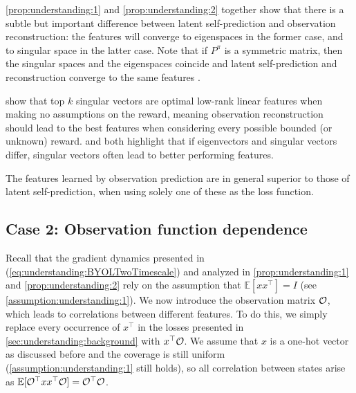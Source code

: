 \autoref{prop:understanding:1} and \autoref{prop:understanding:2} together show that there is a subtle but important difference between latent self-prediction and observation reconstruction: the features will converge to eigenspaces in the former case, and to singular space in the latter case.
Note that if $P^\pi$ is a symmetric matrix, then the singular spaces and the eigenspaces coincide and latent self-prediction and reconstruction converge to the same features \parencite{tang2022understanding}.

\textcite{behzadian2019fast} show that top $k$ singular vectors are optimal low-rank linear features when making no assumptions on the reward, meaning observation reconstruction should lead to the best features when considering every possible bounded (or unknown) reward.
\textcite{behzadian2019fast} and \textcite{lelan2023bootstrapped} both highlight that if eigenvectors and singular vectors differ, singular vectors often lead to better performing features.

\begin{tcolorbox}[boxrule=0.2mm,colback=white,colframe=uoftblue,boxsep=0pt,top=3pt,bottom=5pt]
\begin{insight} The features learned by observation prediction are in general superior to those of latent self-prediction, when using solely one of these as the loss function.
\label{insight:understanding:1}
\end{insight}
\end{tcolorbox}

\subsection{Case 2: Observation function dependence}
\label{sec:understanding:observation}

Recall that the gradient dynamics presented in (\ref{eq:understanding:BYOLTwoTimescale}) and analyzed in \autoref{prop:understanding:1} and \autoref{prop:understanding:2} rely on the assumption that $\mathbb{E}[xx^\top] = I$ (see \autoref{assumption:understanding:1}).
We now introduce the observation matrix ${\mathcal{O}}$, which leads to correlations between different features.
To do this, we simply replace every occurrence of $x^\top$ in the losses presented in \autoref{sec:understanding:background} with $x^\top {\mathcal{O}}$.
We assume that $x$ is a one-hot vector as discussed before and the coverage is still uniform (\autoref{assumption:understanding:1} still holds), so all correlation between states arise as $\mathbb{E}[{\mathcal{O}}^\top x x^\top{\mathcal{O}}] = {\mathcal{O}}^\top {\mathcal{O}}$.

